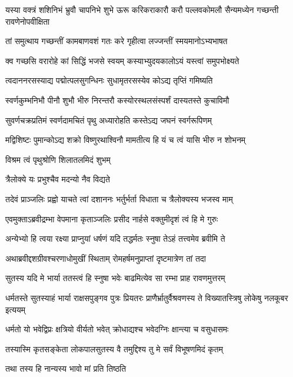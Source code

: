 \threelineshloka
{यस्या वक्त्रं शशिनिभं भ्रुवौ चापनिभे शुभे}
{ऊरू करिकराकारौ करौ पल्लवकोमलौ}
{सैन्यमध्येन गच्छन्ती रावणेनोपवीक्षिता} %

\twolineshloka
{तां समुत्थाय गच्छन्तीं कामबाणवशं गतः}
{करे गृहीत्वा लज्जन्तीं स्मयमानोऽभ्यभाषत} %

\twolineshloka
{क्व गच्छसि वरारोहे कां सिद्धिं भजसे स्वयम्}
{कस्याभ्युदयकालोऽयं यस्त्वां समुपभोक्ष्यते} %

\twolineshloka
{त्वदाननरसस्याद्य पद्मोत्पलसुगन्धिनः}
{सुधामृतरसस्येव कोऽद्य तृप्तिं गमिष्यति} %

\twolineshloka
{स्वर्णकुम्भनिभौ पीनौ शुभौ भीरु निरन्तरौ}
{कस्योरस्थलसंस्पर्शं दास्यतस्ते कुचाविमौ} %

\twolineshloka
{सुवर्णचक्रप्रतिमं स्वर्णदामचितं पृथु}
{अध्यारोहति कस्तेऽद्य जघनं स्वर्गरूपिणम्} %

\twolineshloka
{मद्विशिष्टः पुमान्कोऽद्य शक्रो विष्णुरथाश्विनौ}
{मामतीत्य हि यं च त्वं यासि भीरु न शोभनम्} %

\onelineshloka
{विश्रम त्वं पृथुश्रोणि शिलातलमिदं शुभम्} %

\onelineshloka
{त्रैलोक्ये यः प्रभुश्चैव मदन्यो नैव विद्यते} %

\twolineshloka
{तदेवं प्राञ्जलिः प्रह्वो याचते त्वां दशाननः}
{भर्तुर्भर्ता विधाता च त्रैलोक्यस्य भजस्व माम्} %

\twolineshloka
{एवमुक्ताऽब्रवीद्रम्भा वेपमाना कृताञ्जलिः}
{प्रसीद नार्हसे वक्तुमीदृशं त्वं हि मे गुरुः} %

\twolineshloka
{अन्येभ्यो हि त्वया रक्ष्या प्राप्नुयां धर्षणं यदि}
{तद्धर्मतः स्नुषा तेऽहं तत्त्वमेव ब्रवीमि ते} %

\twolineshloka
{अथाब्रवीद्दशग्रीवश्चरणाधोमुखीं स्थिताम्}
{रोमहर्षमनुप्राप्तां दृष्टमात्रेण तां तदा} %

\twolineshloka
{सुतस्य यदि मे भार्या ततस्त्वं हि स्नुषा भवेः}
{बाढमित्येव सा रम्भा प्राह रावणमुत्तरम्} %

\threelineshloka
{धर्मतस्ते सुतस्याहं भार्या राक्षसपुङ्गव}
{पुत्रः प्रियतरः प्राणैर्भ्रातुर्वैश्रवणस्य ते}
{विख्यातस्त्रिषु लोकेषु नलकूबर इत्ययम्} %

\twolineshloka
{धर्मतो यो भवेद्विप्रः क्षत्रियो वीर्यतो भवेत्}
{क्रोधाद्यश्च भवेदग्निः क्षान्त्या च वसुधासमः} %

\twolineshloka
{तस्यास्मि कृतसङ्केता लोकपालसुतस्य वै}
{तमुद्दिश्य तु मे सर्वं विभूषणमिदं कृतम्} %

\onelineshloka
{तथा तस्य हि नान्यस्य भावो मां प्रति तिष्ठति} %

